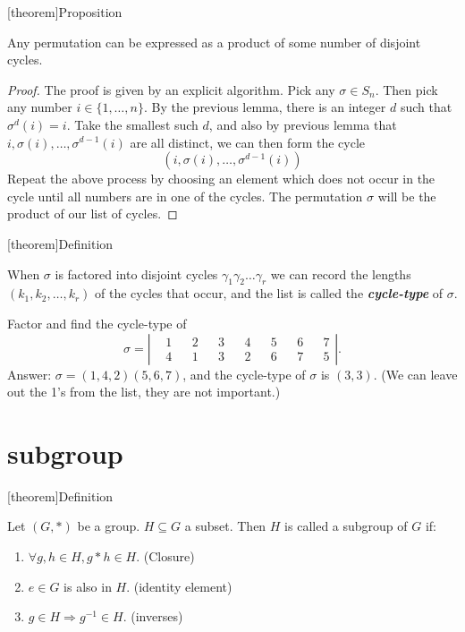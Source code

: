 \documentclass[12pt]{report}
\theoremstyle{definition}
\begin{document}
[theorem]{Proposition}
\begin{permutation expressed as disjoint cycles}
    Any permutation can be expressed as a product of some number of disjoint cycles.
\end{permutation expressed as disjoint cycles}

\begin{proof}
    The proof is given by an explicit algorithm.
    Pick any $\sigma \in S_n$. Then pick any number $i \in \{1, \ldots, n\}$.
    By the previous lemma, there is an integer $d$ such that $\sigma^{d}(i) = i$.
    Take the smallest such $d$, and also by previous lemma that 
    $i, \sigma(i), \ldots, \sigma^{d-1}(i)$ are all distinct, we can then form the cycle\[
        (i, \sigma(i), \ldots, \sigma^{d-1}(i))
    \]Repeat the above process by choosing an element which does not occur in the cycle
    until all numbers are in one of the cycles.
    The permutation $\sigma$ will be the product of our list of cycles.
\end{proof}

[theorem]{Definition}
\begin{cycle-type}
    When $\sigma$ is factored into disjoint cycles $\gamma_1\gamma_2\ldots\gamma_r$
    we can record the lengths $(k_1, k_2,\ldots, k_r)$ of the cycles that occur,
    and the list is called the \textbf{\emph{cycle-type}} of $\sigma$.
\end{cycle-type}

\begin{ex}
    Factor and find the cycle-type of\[
        \sigma = 
        \left|\begin{align*}
            & 1 && 2 && 3 && 4 && 5 && 6 && 7 \\
            & 4 && 1 && 3 && 2 && 6 && 7 && 5
        \end{align*}\right|.
    \]
    Answer: $\sigma = (1, 4, 2)(5, 6, 7)$, and the cycle-type of $\sigma$ is $(3, 3)$.
    (We can leave out the 1's from the list, they are not important.)
\end{ex}

\section{subgroup}

[theorem]{Definition}
\begin{subgroup}
    Let $(G, *)$ be a group. $H \subseteq G$ a subset. Then $H$ is called a subgroup of $G$ if:
    \begin{enumerate}
        \item $\forall g, h \in H, g * h \in H$. (Closure)
        \item $e \in G$ is also in $H$. (identity element)
        \item $g \in H \Rightarrow{}g^{-1} \in H$. (inverses)
    \end{enumerate}
\end{subgroup}
\end{document}
